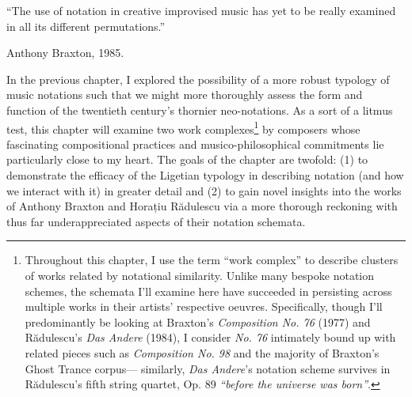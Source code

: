 
\epigraph{\singlespacing ``The use of notation in creative improvised music has yet to be really examined in all its different permutations.''}{Anthony Braxton, 1985.}



    In the previous chapter, I explored the possibility of a more robust typology of music notations such that we might more thoroughly assess the form and function of the twentieth century's thornier neo-notations. As a sort of a litmus test, this chapter will examine two work complexes\footnote{Throughout this chapter, I use the term ``work complex'' to describe clusters of works related by notational similarity. Unlike many bespoke notation schemes, the schemata I'll examine here have succeeded in persisting across multiple works in their artists' respective oeuvres. Specifically, though I'll predominantly be looking at Braxton's \textit{Composition No. 76} (1977) and Rădulescu's \textit{Das Andere} (1984), I consider \textit{No. 76} intimately bound up with related pieces such as \textit{Composition No. 98} and the majority of Braxton's Ghost Trance corpus--- similarly, \textit{Das Andere}'s notation scheme survives in Rădulescu's fifth string quartet, Op. 89 \textit{``before the universe was born''}.} by composers whose fascinating compositional practices and musico-philosophical commitments lie particularly close to my heart. The goals of the chapter are twofold: (1) to demonstrate the efficacy of the Ligetian typology in describing notation (and how we interact with it) in greater detail and (2) to gain novel insights into the works of Anthony Braxton and Horațiu Rădulescu via a more thorough reckoning with thus far underappreciated aspects of their notation schemata.


